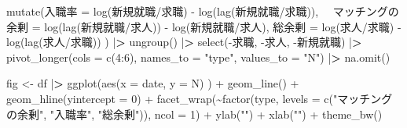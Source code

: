 \documentclass[
]{book}
\newenvironment{Shaded}{\begin{snugshade}}{\end{snugshade}}
\newcommand{\AttributeTok}[1]{\textcolor[rgb]{0.77,0.63,0.00}{#1}}
\newcommand{\DecValTok}[1]{\textcolor[rgb]{0.00,0.00,0.81}{#1}}
\newcommand{\ErrorTok}[1]{\textcolor[rgb]{0.64,0.00,0.00}{\textbf{#1}}}
\newcommand{\FunctionTok}[1]{\textcolor[rgb]{0.00,0.00,0.00}{#1}}
\newcommand{\NormalTok}[1]{#1}
\newcommand{\OtherTok}[1]{\textcolor[rgb]{0.56,0.35,0.01}{#1}}
\newcommand{\SpecialCharTok}[1]{\textcolor[rgb]{0.00,0.00,0.00}{#1}}
\newcommand{\StringTok}[1]{\textcolor[rgb]{0.31,0.60,0.02}{#1}}
\begin{document}
\begin{Shaded}
\begin{Highlighting}[]
  \FunctionTok{mutate}\NormalTok{(入職率 }\OtherTok{=} \FunctionTok{log}\NormalTok{(新規就職}\SpecialCharTok{/}\NormalTok{求職) }\SpecialCharTok{{-}} \FunctionTok{log}\NormalTok{(}\FunctionTok{lag}\NormalTok{(新規就職}\SpecialCharTok{/}\NormalTok{求職)),}
\NormalTok{        　マッチングの余剰 }\OtherTok{=} \FunctionTok{log}\NormalTok{(}\FunctionTok{lag}\NormalTok{(新規就職}\SpecialCharTok{/}\NormalTok{求人)) }\SpecialCharTok{{-}} \FunctionTok{log}\NormalTok{(新規就職}\SpecialCharTok{/}\NormalTok{求人),}
\NormalTok{           総余剰 }\OtherTok{=} \FunctionTok{log}\NormalTok{(求人}\SpecialCharTok{/}\NormalTok{求職) }\SpecialCharTok{{-}} \FunctionTok{log}\NormalTok{(}\FunctionTok{lag}\NormalTok{(求人}\SpecialCharTok{/}\NormalTok{求職))}
\NormalTok{           ) }\SpecialCharTok{|}\ErrorTok{\textgreater{}} 
  \FunctionTok{ungroup}\NormalTok{() }\SpecialCharTok{|}\ErrorTok{\textgreater{}} 
  \FunctionTok{select}\NormalTok{(}\SpecialCharTok{{-}}\NormalTok{求職,}
         \SpecialCharTok{{-}}\NormalTok{求人,}
         \SpecialCharTok{{-}}\NormalTok{新規就職) }\SpecialCharTok{|}\ErrorTok{\textgreater{}} 
  \FunctionTok{pivot\_longer}\NormalTok{(}\AttributeTok{cols =} \FunctionTok{c}\NormalTok{(}\DecValTok{4}\SpecialCharTok{:}\DecValTok{6}\NormalTok{),}
               \AttributeTok{names\_to =} \StringTok{"type"}\NormalTok{,}
               \AttributeTok{values\_to =} \StringTok{"N"}\NormalTok{) }\SpecialCharTok{|}\ErrorTok{\textgreater{}} 
  \FunctionTok{na.omit}\NormalTok{()}

\NormalTok{fig }\OtherTok{\textless{}{-}}
\NormalTok{  df }\SpecialCharTok{|}\ErrorTok{\textgreater{}} 
  \FunctionTok{ggplot}\NormalTok{(}\FunctionTok{aes}\NormalTok{(}\AttributeTok{x =}\NormalTok{ date,}
             \AttributeTok{y =}\NormalTok{ N)}
\NormalTok{         ) }\SpecialCharTok{+}
  \FunctionTok{geom\_line}\NormalTok{() }\SpecialCharTok{+}
  \FunctionTok{geom\_hline}\NormalTok{(}\AttributeTok{yintercept =} \DecValTok{0}\NormalTok{) }\SpecialCharTok{+}
  \FunctionTok{facet\_wrap}\NormalTok{(}\SpecialCharTok{\textasciitilde{}}\FunctionTok{factor}\NormalTok{(type,}
                     \AttributeTok{levels =} \FunctionTok{c}\NormalTok{(}\StringTok{"マッチングの余剰"}\NormalTok{,}
                                \StringTok{"入職率"}\NormalTok{,}
                                \StringTok{"総余剰"}\NormalTok{)),}
             \AttributeTok{ncol =} \DecValTok{1}\NormalTok{) }\SpecialCharTok{+}
  \FunctionTok{ylab}\NormalTok{(}\StringTok{""}\NormalTok{) }\SpecialCharTok{+}
  \FunctionTok{xlab}\NormalTok{(}\StringTok{""}\NormalTok{) }\SpecialCharTok{+}
  \FunctionTok{theme\_bw}\NormalTok{()}
\end{Highlighting}
\end{Shaded}
\end{document}
